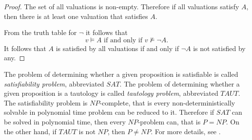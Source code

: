 \begin{proof}
The set of all valuations is non-empty.
Therefore if all valuations satisfy $A$, then there is at least one valuation that satisfies $A$.

From the truth table for $\neg$ it follows that
\[
v \vDash A \text{ if and only if } v \nvDash \neg A.
\]
It follows that $A$ is satisfied by all valuations if and only if $\neg A$ is not satisfied by any.
\end{proof}

The problem of determining whether a given proposition is satisfiable is called \emph{satisfiability problem}, abbreviated $SAT$.
The problem of determining whether a given proposition is a tautology is called \emph{tautology problem}, abbreviated $TAUT$.
The satisfiability problem is $NP$-complete, that is every non-deterministically solvable in polynomial time problem can be reduced to it.
Therefore if $SAT$ can be solved in polynomial time, then every $NP$-problem can, that is $P=NP$.
On the other hand, if $TAUT$ is not $NP$, then $P \ne NP$.
For more details, see \cite[Section 3.3.5]{Gallier}.
